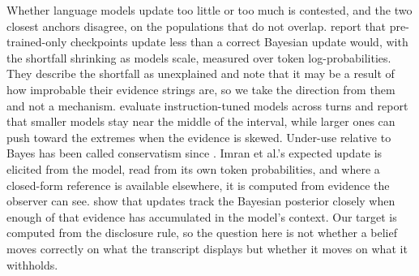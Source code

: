 \documentclass{article}
\theoremstyle{plain}
\theoremstyle{definition}
\theoremstyle{remark}
\begin{document}
Whether language models update too little or too much is contested, and the two
closest anchors disagree, on the populations that do not overlap.
\citet{imran2025} report that pre-trained-only checkpoints update less than
a correct Bayesian update would, with the shortfall shrinking as models scale, measured over
token log-probabilities. They describe the shortfall as unexplained and
note that it may be a result of how improbable their evidence strings are, so we take
the direction from them and not a mechanism. \citet{bayesbench2026} evaluate
instruction-tuned models across turns and report that smaller models stay near 
the middle of the interval, while larger ones can push toward the extremes when the evidence is
skewed. Under-use relative to Bayes has been called conservatism since
\citet{edwards1968}.
Imran et al.'s expected update is elicited from the model, read from
its own token probabilities, and where a closed-form reference is available
elsewhere, it is computed from evidence the observer can see.
\citet{gupta2025} show that updates track the Bayesian
posterior closely when enough of that evidence has accumulated in the model's
context. Our target is computed from the disclosure rule,
so the question here is not whether a belief moves correctly on
what the transcript displays but whether it moves on what it
withholds.

\end{document}
